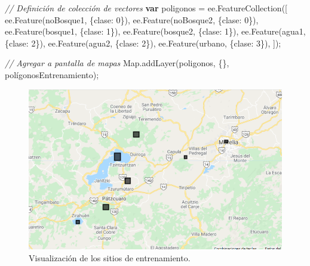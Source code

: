 \documentclass[
  12pt,
  letterpaper,
  twoside]{book}
\newenvironment{Shaded}{\begin{snugshade}}{\end{snugshade}}
\newcommand{\CommentTok}[1]{\textcolor[rgb]{0.24,0.58,0.00}{\textit{#1}}}
\newcommand{\ControlFlowTok}[1]{\textcolor[rgb]{0.00,0.00,0.00}{\textbf{#1}}}
\newcommand{\DecValTok}[1]{\textcolor[rgb]{0.28,0.53,0.93}{#1}}
\newcommand{\FunctionTok}[1]{\textcolor[rgb]{0.48,0.12,0.64}{#1}}
\newcommand{\KeywordTok}[1]{\textcolor[rgb]{0.48,0.12,0.64}{#1}}
\newcommand{\NormalTok}[1]{#1}
\newcommand{\OperatorTok}[1]{\textcolor[rgb]{0.00,0.00,0.00}{#1}}
\newcommand{\StringTok}[1]{\textcolor[rgb]{0.87,0.29,0.22}{#1}}
\begin{document}
\begin{Shaded}
\begin{Highlighting}[]
\CommentTok{// Definición de colección de vectores}
\ControlFlowTok{var}\NormalTok{ poligonos }\OperatorTok{=} \KeywordTok{ee}\OperatorTok{.}\FunctionTok{FeatureCollection}\NormalTok{([}
  \KeywordTok{ee}\OperatorTok{.}\FunctionTok{Feature}\NormalTok{(noBosque1}\OperatorTok{,}\NormalTok{ \{}\StringTok{\textquotesingle{}clase\textquotesingle{}}\OperatorTok{:} \DecValTok{0}\NormalTok{\})}\OperatorTok{,}
  \KeywordTok{ee}\OperatorTok{.}\FunctionTok{Feature}\NormalTok{(noBosque2}\OperatorTok{,}\NormalTok{ \{}\StringTok{\textquotesingle{}clase\textquotesingle{}}\OperatorTok{:} \DecValTok{0}\NormalTok{\})}\OperatorTok{,}
  \KeywordTok{ee}\OperatorTok{.}\FunctionTok{Feature}\NormalTok{(bosque1}\OperatorTok{,}\NormalTok{ \{}\StringTok{\textquotesingle{}clase\textquotesingle{}}\OperatorTok{:} \DecValTok{1}\NormalTok{\})}\OperatorTok{,}
  \KeywordTok{ee}\OperatorTok{.}\FunctionTok{Feature}\NormalTok{(bosque2}\OperatorTok{,}\NormalTok{ \{}\StringTok{\textquotesingle{}clase\textquotesingle{}}\OperatorTok{:} \DecValTok{1}\NormalTok{\})}\OperatorTok{,}
  \KeywordTok{ee}\OperatorTok{.}\FunctionTok{Feature}\NormalTok{(agua1}\OperatorTok{,}\NormalTok{ \{}\StringTok{\textquotesingle{}clase\textquotesingle{}}\OperatorTok{:} \DecValTok{2}\NormalTok{\})}\OperatorTok{,}
  \KeywordTok{ee}\OperatorTok{.}\FunctionTok{Feature}\NormalTok{(agua2}\OperatorTok{,}\NormalTok{ \{}\StringTok{\textquotesingle{}clase\textquotesingle{}}\OperatorTok{:} \DecValTok{2}\NormalTok{\})}\OperatorTok{,}
  \KeywordTok{ee}\OperatorTok{.}\FunctionTok{Feature}\NormalTok{(urbano}\OperatorTok{,}\NormalTok{ \{}\StringTok{\textquotesingle{}clase\textquotesingle{}}\OperatorTok{:} \DecValTok{3}\NormalTok{\})}\OperatorTok{,}
\NormalTok{])}\OperatorTok{;}

\CommentTok{// Agregar a pantalla de mapas}
\KeywordTok{Map}\OperatorTok{.}\FunctionTok{addLayer}\NormalTok{(poligonos}\OperatorTok{,}\NormalTok{ \{\}}\OperatorTok{,} \StringTok{\textquotesingle{}polígonosEntrenamiento\textquotesingle{}}\NormalTok{)}\OperatorTok{;}
\end{Highlighting}
\end{Shaded}

\begin{figure}[H]

{\centering \includegraphics[width=0.8\linewidth]{Img/polyTrain} 

}

\caption{Visualización de los sitios de entrenamiento.}\label{fig:fc121}
\end{figure}
\end{document}
